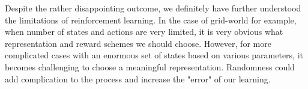 Despite the rather disappointing outcome, we definitely have further understood the limitations of reinforcement learning. In the case of grid-world for example, when number of states and actions are very limited, it is very obvious what representation and reward schemes we should choose. However, for more complicated cases with an enormous set of states based on various parameters, it becomes challenging to choose a meaningful representation. Randomness could add complication to the process and increase the "error" of our learning.